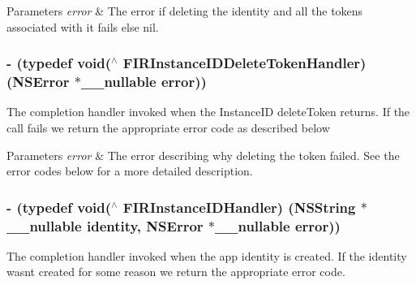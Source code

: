 \begin{DoxyParams}{Parameters}
{\em error} & The error if deleting the identity and all the tokens associated with it fails else nil. \\
\hline
\end{DoxyParams}
\hypertarget{interface_f_i_r_instance_i_d_a511dc978f832ebb91d45a67c66b5873c}{}
\subsubsection[{F\+I\+R\+Instance\+I\+D\+Delete\+Token\+Handler}]{\setlength{\rightskip}{0pt plus 5cm}-\/ (typedef void($^\wedge$ F\+I\+R\+Instance\+I\+D\+Delete\+Token\+Handler) (N\+S\+Error $\ast$\+\_\+\+\_\+nullable error))\hspace{0.3cm}{\ttfamily [related]}}\label{interface_f_i_r_instance_i_d_a511dc978f832ebb91d45a67c66b5873c}
The completion handler invoked when the Instance\+I\+D {\ttfamily delete\+Token} returns. If the call fails we return the appropriate {\ttfamily error code} as described below


\begin{DoxyParams}{Parameters}
{\em error} & The error describing why deleting the token failed. See the error codes below for a more detailed description. \\
\hline
\end{DoxyParams}
\hypertarget{interface_f_i_r_instance_i_d_af36e2c9155abb05a1a05092d93322229}{}
\subsubsection[{F\+I\+R\+Instance\+I\+D\+Handler}]{\setlength{\rightskip}{0pt plus 5cm}-\/ (typedef void($^\wedge$ F\+I\+R\+Instance\+I\+D\+Handler) (N\+S\+String $\ast$\+\_\+\+\_\+nullable identity, N\+S\+Error $\ast$\+\_\+\+\_\+nullable error))\hspace{0.3cm}{\ttfamily [related]}}\label{interface_f_i_r_instance_i_d_af36e2c9155abb05a1a05092d93322229}
The completion handler invoked when the app identity is created. If the identity wasn\textquotesingle{}t created for some reason we return the appropriate error code.



